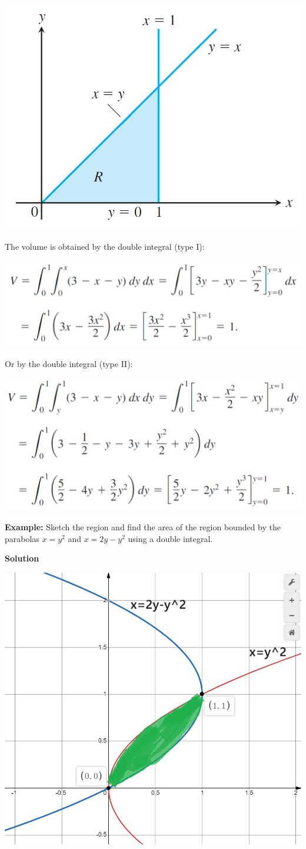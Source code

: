 \documentclass{article}
\begin{document}
\begin{center}
    \includegraphics[width=0.4\linewidth]{so1.png}
\end{center}
The volume is obtained by the double integral (type I):
\begin{center}
    \includegraphics[width=0.6\linewidth]{sol1.png}
\end{center}
Or by the double integral (type II):
\begin{center}
    \includegraphics[width=0.6\linewidth]{sol12.png}
\end{center}
\textbf{Example: }Sketch the region and find the area of the region bounded by the parabolas $x=y^2$ and $x=2y-y^2$ using a double integral.
\begin{center}
    \textbf{Solution}
\end{center}
\begin{center}
    \includegraphics[width=0.45\linewidth]{R2.png}
\end{center}
\end{document}
